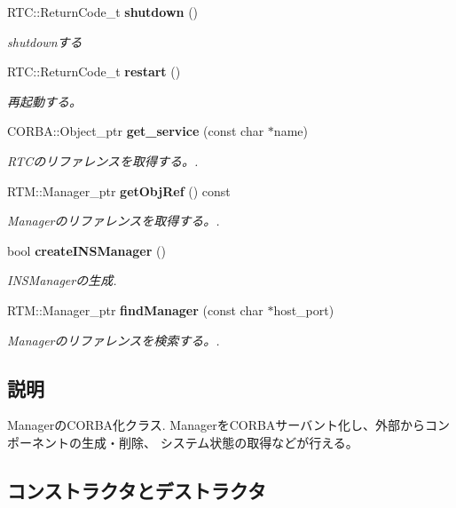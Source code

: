 \begin{DoxyCompactItemize}
RTC::ReturnCode\_\-t {\bf shutdown} ()
\begin{DoxyCompactList}\small\item\em shutdownする \item\end{DoxyCompactList}\item 
RTC::ReturnCode\_\-t {\bf restart} ()
\begin{DoxyCompactList}\small\item\em 再起動する。 \item\end{DoxyCompactList}\item 
CORBA::Object\_\-ptr {\bf get\_\-service} (const char $\ast$name)
\begin{DoxyCompactList}\small\item\em RTCのリファレンスを取得する。. \item\end{DoxyCompactList}\item 
RTM::Manager\_\-ptr {\bf getObjRef} () const 
\begin{DoxyCompactList}\small\item\em Managerのリファレンスを取得する。. \item\end{DoxyCompactList}\item 
bool {\bf createINSManager} ()
\begin{DoxyCompactList}\small\item\em INSManagerの生成. \item\end{DoxyCompactList}\item 
RTM::Manager\_\-ptr {\bf findManager} (const char $\ast$host\_\-port)
\begin{DoxyCompactList}\small\item\em Managerのリファレンスを検索する。. \item\end{DoxyCompactList}\end{DoxyCompactItemize}


\subsection{説明}
ManagerのCORBA化クラス. ManagerをCORBAサーバント化し、外部からコンポーネントの生成・削除、 システム状態の取得などが行える。 

\subsection{コンストラクタとデストラクタ}
